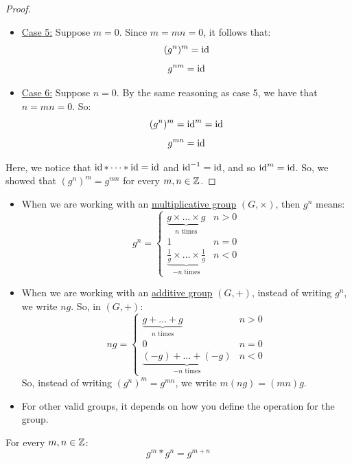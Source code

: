 \documentclass[letterpaper]{article}
\begin{document}
\begin{mdframed}
\begin{proof}
\begin{itemize}
            \item \underline{Case 5:} Suppose $m = 0$. Since $m = mn = 0$, it follows that: 
            \[(g^n)^m = \operatorname{id}\]
            \[g^{nm} = \operatorname{id}\]

            \item \underline{Case 6:} Suppose $n = 0$. By the same reasoning as case 5, we have that $n = mn = 0$. So: 
            \[(g^n)^m = \operatorname{id}^m = \operatorname{id}\]
            \[g^{mn} = \operatorname{id}\]
        \end{itemize}

        Here, we notice that $\operatorname{id} * \dots * \operatorname{id} = \operatorname{id}$ and $\operatorname{id}^{-1} = \operatorname{id}$, and so $\operatorname{id}^m = \operatorname{id}$. So, we showed that $(g^n)^m = g^{mn}$ for every $m, n \in \mathbb{Z}$. 
    \end{proof}
\end{mdframed}

\begin{note*}{}{}
    \begin{itemize}
        \item When we are working with an \underline{multiplicative group} $(G, \times)$, then $g^n$ means:
        \[g^n = \begin{cases}
            \underbrace{g \times \dots \times g}_{n \text{ times}} & n > 0 \\ 
            1 & n = 0 \\ 
            \underbrace{\frac{1}{g} \times \dots \times \frac{1}{g}}_{-n \text{ times}} & n < 0
        \end{cases}\]

        \item When we are working with an \underline{additive group} $(G, +)$, instead of writing $g^n$, we write $ng$. So, in $(G, +)$: 
        \[ng = \begin{cases}
            \underbrace{g + \dots + g}_{n \text{ times}} & n > 0 \\ 
            0 & n = 0 \\ 
            \underbrace{(-g) + \dots + (-g)}_{-n \text{ times}} & n < 0
        \end{cases}\]
        So, instead of writing $(g^{n})^m = g^{mn}$, we write $m(ng) = (mn)g$.

        \item For other valid groups, it depends on how you define the operation for the group. 
    \end{itemize}
\end{note*}

\begin{lemma}{}{}
    For every $m, n \in \mathbb{Z}$: 
    \[g^m * g^n = g^{m + n}\]
\end{lemma}
\end{document}

